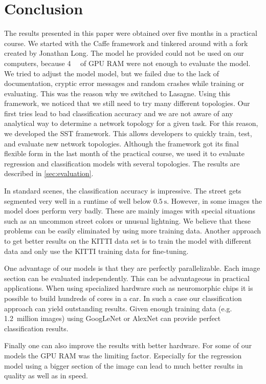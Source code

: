 
\section{Conclusion}\label{sec:discussion}

The results presented in this paper were obtained over five months in a
practical course. We started with the Caffe framework and tinkered around with
a fork created by Jonathan Long. The model he provided could not be used on our
computers, because \SI{4}{\gibi\byte} of GPU RAM were not enough to evaluate
the model. We tried to adjust the model model, but we failed due to the lack of
documentation, cryptic error messages and random crashes while training or
evaluating. This was the reason why we switched to Lasagne. Using this
framework, we noticed that we still need to try many different topologies. Our
first tries lead to bad classification accuracy and we are not aware of any
analytical way to determine a network topology for a given task. For this
reason, we developed the SST framework. This allows developers to quickly
train, test, and evaluate new network topologies. Although the framework got
its final flexible form in the last month of the practical course, we used it
to evaluate regression and classification models with several topologies. The
results are described in \cref{sec:evaluation}.

In standard scenes, the classification accuracy is impressive. The street gets
segmented very well in a runtime of well below  $\SI{0.5}{\second}$. However,
in some images the model does perform very badly. These are mainly images with
special situations such as an uncommon street colors or unusual lightning. We
believe that these problems can be easily eliminated by using more training
data. Another approach to get better results on the KITTI data set is to train
the model with different data and only use the KITTI training data for
fine-tuning.

One advantage of our models is that they are perfectly parallelizable. Each
image section can be evaluated independently. This can be advantageous in
practical applications. When using specialized hardware such as neuromorphic
chips it is possible to build hundreds of cores in a car. In such a case our
classification approach can yield outstanding results. Given enough training
data (e.g. 1.2~million images) using GoogLeNet or AlexNet can provide perfect
classification results.

Finally one can also improve the results with better hardware. For some of our
models the \gls{GPU} RAM was the limiting factor. Especially for the regression
model using a bigger section of the image can lead to much better results in
quality as well as in speed.
